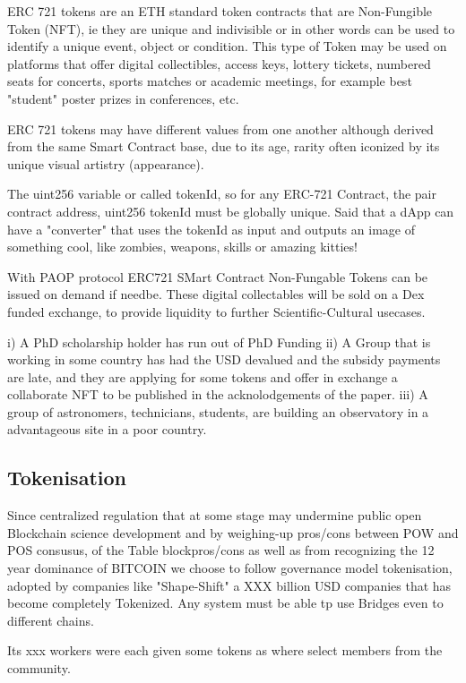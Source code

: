 \documentclass[final,5p,times,twocolumn,authoryear]{elsarticle}
\begin{document}
ERC 721 tokens are an ETH standard token contracts that are Non-Fungible Token (NFT), ie they are unique and indivisible or in other words can be used to identify a unique event, object or condition. This type of Token may be used on platforms that offer digital collectibles, access keys, lottery tickets, numbered seats for concerts, sports matches or academic meetings, for example best "student" poster prizes in conferences, etc. 

ERC 721 tokens may have different values from one another although derived from the same Smart Contract base, due to its age, rarity often iconized by its unique visual artistry (appearance).

The uint256 variable or called tokenId, so for any ERC-721 Contract, the pair contract address, uint256 tokenId must be globally unique. Said that a dApp can have a "converter" that uses the tokenId as input and outputs an image of something cool, like zombies, weapons, skills or amazing kitties!


With PAOP protocol ERC721 SMart Contract Non-Fungable Tokens can be issued on demand if needbe. These digital collectables will be sold on a Dex funded exchange, to provide liquidity to further Scientific-Cultural usecases.

i) A PhD scholarship holder has run out of PhD Funding 
ii) A Group that is working in some country has had the USD devalued and the subsidy payments are late, and they are applying for some tokens and offer in exchange a collaborate NFT to be published in the acknolodgements of the paper.
iii) A group of astronomers, technicians, students,  are building an observatory in a advantageous site in a poor country. 

\subsection{Tokenisation}

Since centralized regulation that at some stage may undermine public open Blockchain science development and by weighing-up pros/cons between POW and POS consusus, of the Table blockpros/cons as well as from recognizing the 12 year dominance of BITCOIN we choose to follow governance model tokenisation, adopted by  companies like "Shape-Shift" a XXX billion USD companies that has become completely Tokenized. Any system must be able tp use Bridges even to different chains. 

Its xxx workers were each given some tokens as where select members from the community. 
\end{document}
